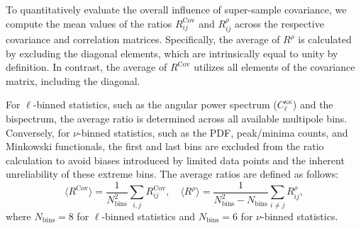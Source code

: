 To quantitatively evaluate the overall influence of super-sample covariance, we compute the mean values of the ratios $R^{\mathrm{Cov}}_{ij}$ and $R^{\rho}_{ij}$ across the respective covariance and correlation matrices. Specifically, the average of $R^{\rho}$ is calculated by excluding the diagonal elements, which are intrinsically equal to unity by definition. In contrast, the average of $R^{\mathrm{Cov}}$ utilizes all elements of the covariance matrix, including the diagonal. 

For $\ell$-binned statistics, such as the angular power spectrum ($C_\ell^{\kappa\kappa}$) and the bispectrum, the average ratio is determined across all available multipole bins. Conversely, for $\nu$-binned statistics, such as the PDF, peak/minima counts, and Minkowski functionals, the first and last bins are excluded from the ratio calculation to avoid biases introduced by limited data points and the inherent unreliability of these extreme bins. The average ratios are defined as follows:
\begin{equation}
    \langle R^{\mathrm{Cov}} \rangle = \frac{1}{N_{\mathrm{bins}}^2} \sum_{i, j} R^{\mathrm{Cov}}_{ij}, \quad \langle R^{\rho} \rangle = \frac{1}{N_{\mathrm{bins}}^2 - N_{\mathrm{bins}}} \sum_{i \neq j} R^{\rho}_{ij},
\end{equation}
where $N_{\mathrm{bins}} = 8$ for $\ell$-binned statistics and $N_{\mathrm{bins}} = 6$ for $\nu$-binned statistics.